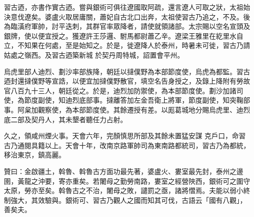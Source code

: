 \begin{pinyinscope}
 習古迺，亦書作實古迺。嘗與銀術可俱往遼國取阿疏，還言遼人可取之狀，太祖始決意伐遼矣。婆盧火取居庸關，蕭妃自古北口出奔，太祖使習古乃追之，不及。後為臨潢府軍帥，討平迭刺，其群官率眾降者，請使就領諸部。太宗賜以空名宣頭及銀牌，使以便宜授之。獲遼許王莎邏、駙馬都尉蕭乙辛。遼梁王雅里在紇里水自立，不知果在何處，至是始知之。於是，徙遼降人於泰州，時暑未可徙，習古乃請姑處之嶺西。及習古迺築新城
 於契丹周特城，詔置會平州。



 烏虎里部人迪烈、劃沙率部族降，朝廷以撻僕野為本部節度使，烏虎為都監。習古迺封還撻僕野等宣誥，以便宜加撻僕野散官，填空名告身授之，及錄上降附有勞故官八百九十三人，朝廷從之。於是，迪烈加防禦使，為本部節度使。劃沙加諸司使，為節度副使，知迪烈底部事。撻離答加左金吾衛上將軍，節度副使，知突鞠部事。阿枲加觀察使，為本部節度使。其餘遷授有差。以厖葛城地分賜烏虎里、迪烈底二部及契丹人，其未墾者聽任力占射。



 久之，領咸州煙火事。天會六年，完顏慎思所部及其餘未置猛安謀
 克戶口，命習古乃通閱具籍以上。天會十年，改南京路軍帥司為東南路都統司，習古乃為都統，移治東京，鎮高麗。



 贊曰：金啟疆土，斡魯、斡魯古方面功最先著，婆盧火、婁室最先封，泰州之邊圉，黃龍之沖要，寄亦重矣。若闍母之勤勞南路，婁室之經營陜西，銀術可之圍守太原，勞亦至矣。斡魯古之不治，闍母之敗，譴罰之亟，諸將慴焉。夫能以弱小終制強大，其效驗與。銀術可、習古乃觀人之國而知其可伐，古語云「國有八觀」，善矣夫。



\end{pinyinscope}